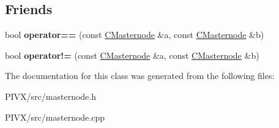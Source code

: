 \subsection*{Friends}
\begin{DoxyCompactItemize}
\item 
\mbox{\label{class_c_masternode_ac3549be50afdc1acd8be9a763cb7b355}} 
bool {\bfseries operator==} (const \mbox{\hyperlink{class_c_masternode}{C\+Masternode}} \&a, const \mbox{\hyperlink{class_c_masternode}{C\+Masternode}} \&b)
\item 
\mbox{\label{class_c_masternode_ab717eb8dbdf0438855bd30eb922fe73a}} 
bool {\bfseries operator!=} (const \mbox{\hyperlink{class_c_masternode}{C\+Masternode}} \&a, const \mbox{\hyperlink{class_c_masternode}{C\+Masternode}} \&b)
\end{DoxyCompactItemize}


The documentation for this class was generated from the following files\+:\begin{DoxyCompactItemize}
\item 
P\+I\+V\+X/src/masternode.\+h\item 
P\+I\+V\+X/src/masternode.\+cpp\end{DoxyCompactItemize}
